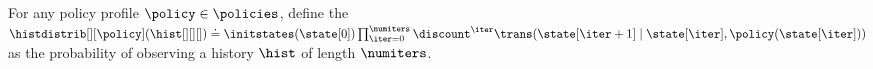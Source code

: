 For any policy profile $\policy \in \policies$,
define the  $\histdistrib[][\policy] (\hist[][][]) \doteq \initstates (\state[0]) \prod_{\iter = 0}^\numiters \discount^\iter \trans (\state[\iter +1] \mid \state[\iter], \policy (\state[\iter]))$ as the probability of observing a history $\hist$ of length $\numiters$. 
